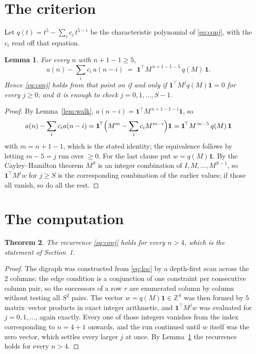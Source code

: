 \documentclass[11pt,a4paper]{article}
\theoremstyle{plain}
\newtheorem{theorem}{Theorem}
\newtheorem{lemma}[theorem]{Lemma}
\theoremstyle{definition}
\begin{document}
\section{The criterion}

Let $q(t)=t^{5}-\sum_i c_i\,t^{5-i}$ be the characteristic polynomial of
\eqref{eq:conj}, with the $c_i$ read off that equation.

\begin{lemma}\label{lem:crit}
For every $n$ with $n+1-1\ge5$,
\[
a(n)-\sum_i c_i\,a(n-i)\;=\;\mathbf{1}^{\!\top}M^{\,n+1-1-5}\,q(M)\,\mathbf{1} .
\]
Hence \eqref{eq:conj} holds from that point on if and only if
$\mathbf{1}^{\!\top}M^{j}q(M)\mathbf{1}=0$ for every $j\ge0$; and it is enough to check
$j=0,1,\dots,S-1$.
\end{lemma}

\begin{proof}
By Lemma~\ref{lem:walk}, $a(n-i)=\mathbf{1}^{\!\top}M^{\,n+1-1-i}\mathbf{1}$, so
\[
a(n)-\sum_i c_i a(n-i)
=\mathbf{1}^{\!\top}\Bigl(M^{m}-\sum_i c_i M^{m-i}\Bigr)\mathbf{1}
=\mathbf{1}^{\!\top}M^{\,m-5}\,q(M)\,\mathbf{1}
\]
with $m=n+1-1$, which is the stated identity; the equivalence follows by letting
$m-5=j$ run over $\ge0$. For the last clause put $w=q(M)\mathbf{1}$. By the
Cayley--Hamilton theorem $M^{S}$ is an integer combination of $I,M,\dots,M^{S-1}$, so
$\mathbf{1}^{\!\top}M^{j}w$ for $j\ge S$ is the corresponding combination of the earlier
values; if those all vanish, so do all the rest.
\end{proof}

\section{The computation}

\begin{theorem}
The recurrence \eqref{eq:conj} holds for every $n>4$, which is the statement of
Section~1.
\end{theorem}

\begin{proof}
The digraph was constructed from \eqref{eq:loc} by a depth-first scan across the $2$
columns: the edge condition is a conjunction of one constraint per consecutive column
pair, so the successors of a row $r$ are enumerated column by column without testing all
$S^2$ pairs. The vector $w=q(M)\mathbf{1}\in\mathbb{Z}^{S}$ was then formed by $5$
matrix--vector products in exact integer arithmetic, and $\mathbf{1}^{\!\top}M^{j}w$ was
evaluated for $j=0,1,\dots$, again exactly. Every one of those integers vanishes from the
index corresponding to $n=4+1$ onwards, and the run continued until $w$ itself was the
zero vector, which settles every larger $j$ at once. By Lemma~\ref{lem:crit} the recurrence
holds for every $n>4$.
\end{proof}
\end{document}
